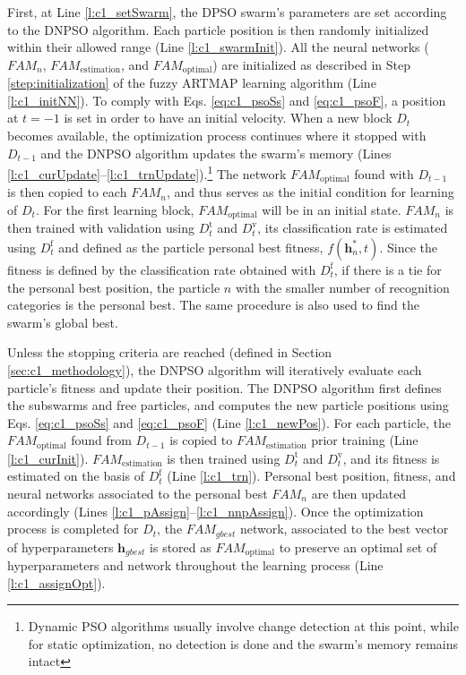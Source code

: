 First, at Line \ref{l:c1_setSwarm}, the DPSO swarm's parameters are set according to the DNPSO algorithm. Each particle position is then randomly initialized within their allowed range (Line \ref{l:c1_swarmInit}). All the neural networks ($\textit{FAM}_n$, $\textit{FAM}_\text{estimation}$, and $\textit{FAM}_\text{optimal}$) are initialized as described in Step \ref{step:initialization} of the fuzzy ARTMAP learning algorithm (Line \ref{l:c1_initNN}). To comply with Eqs. \ref{eq:c1_psoSs} and \ref{eq:c1_psoF}, a position at $t=-1$ is set in order to have an initial velocity. When a new block $D_t$ becomes available, the optimization process continues where it stopped with $D_{t-1}$ and the DNPSO algorithm updates the swarm's memory (Lines \ref{l:c1_curUpdate}--\ref{l:c1_trnUpdate}).\footnote{Dynamic PSO algorithms usually involve change detection at this point, while for static optimization, no detection is done and the swarm's memory remains intact} The network $\textit{FAM}_\text{optimal}$ found with $D_{t-1}$ is then copied to each $\textit{FAM}_n$, and thus serves as the initial condition for learning of $D_t$. For the first learning block, $\textit{FAM}_\text{optimal}$ will be in an initial state.  $\textit{FAM}_n$ is then trained with validation using $D_t^\text{t}$ and $D_t^\text{v}$, its classification rate is estimated using $D_t^\text{f}$ and defined as the particle personal best fitness, $f(\textbf{h}_n^*,t)$. Since the fitness is defined by the classification rate obtained with $D_t^\text{f}$, if there is a tie for the personal best position, the particle $n$ with the smaller number of recognition categories is the personal best. The same procedure is also used to find the swarm's global best.

Unless the stopping criteria are reached (defined in Section \ref{sec:c1_methodology}), the DNPSO algorithm will iteratively evaluate each particle's fitness and update their position. The DNPSO algorithm first defines the subswarms and free particles, and computes the new particle positions using Eqs. \ref{eq:c1_psoSs} and \ref{eq:c1_psoF} (Line \ref{l:c1_newPos}). For each particle, the $\textit{FAM}_\text{optimal}$ found from $D_{t-1}$ is copied to $\textit{FAM}_\text{estimation}$ prior training (Line \ref{l:c1_curInit}). $\textit{FAM}_\text{estimation}$ is then trained using $D_t^\text{t}$ and $D_t^\text{v}$, and its fitness is estimated on the basis of $D_t^\text{f}$ (Line \ref{l:c1_trn}). Personal best position, fitness, and neural networks associated to the personal best $\textit{FAM}_n$ are then updated accordingly (Lines \ref{l:c1_pAssign}--\ref{l:c1_nnpAssign}). Once the optimization process is completed for $D_t$, the $\textit{FAM}_\textit{gbest}$ network, associated to the best vector of hyperparameters $\textbf{h}_\textit{gbest}$ is stored as $\textit{FAM}_\text{optimal}$ to preserve an optimal set of hyperparameters and network throughout the learning process (Line \ref{l:c1_assignOpt}).

